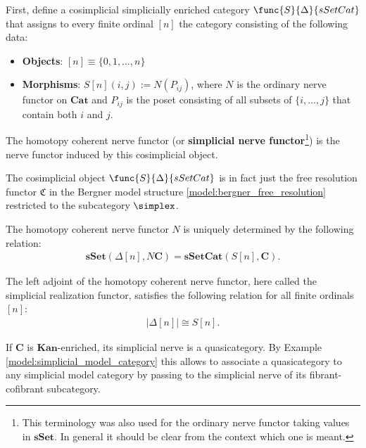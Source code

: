     First, define a cosimplicial simplicially enriched category $\func{S}{\Delta}{sSetCat}$ that assigns to every finite ordinal $[n]$ the category consisting of the following data:
    \begin{itemize}
        \item\textbf{Objects}: $[n]\equiv\{0,1,\ldots,n\}$
        \item\textbf{Morphisms}: $S[n](i,j) := N(P_{ij})$, where $N$ is the ordinary nerve functor on $\mathbf{Cat}$ and $P_{ij}$ is the poset consisting of all subsets of $\{i,\ldots,j\}$ that contain both $i$ and $j$.
    \end{itemize}
    The homotopy coherent nerve functor (or \textbf{simplicial nerve functor}\footnote{This terminology was also used for the ordinary nerve functor taking values in $\mathbf{sSet}$. In general it should be clear from the context which one is meant.}) is the nerve functor induced by this cosimplicial object.
    \begin{remark}
        The cosimplicial object $\func{S}{\Delta}{sSetCat}$ is in fact just the free resolution functor $\mathfrak{C}$ in the Bergner model structure \ref{model:bergner_free_resolution} restricted to the subcategory $\simplex$.
    \end{remark}

    \begin{property}
        The homotopy coherent nerve functor $N$ is uniquely determined by the following relation:
        \begin{gather}
            \mathbf{sSet}(\Delta[n],N\mathbf{C})=\mathbf{sSetCat}(S[n],\mathbf{C}).
        \end{gather}
    \end{property}

    \begin{property}
        The left adjoint of the homotopy coherent nerve functor, here called the simplicial realization functor, satisfies the following relation for all finite ordinals $[n]$:
        \begin{gather}
            |\Delta[n]|\cong S[n].
        \end{gather}
    \end{property}

    \begin{property}[Quasicategories]
        If $\mathbf{C}$ is $\mathbf{Kan}$-enriched, its simplicial nerve is a quasicategory. By Example \ref{model:simplicial_model_category} this allows to associate a quasicategory to any simplicial model category by passing to the simplicial nerve of its fibrant-cofibrant subcategory.
    \end{property}

